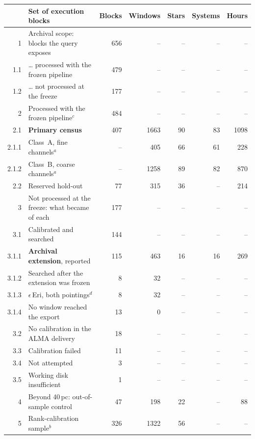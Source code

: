 \begin{tabular}{@{}r@{~}p{}rrrrr@{}}
\hline
 & Set of execution blocks & Blocks & Windows & Stars & Systems & Hours \\
\hline
1 & Archival scope: blocks the query exposes & 656 & -- & -- & -- & -- \\
1.1 & \hspace{0.8em}\ldots{} processed with the frozen pipeline & 479 & -- & -- & -- & -- \\
1.2 & \hspace{0.8em}\ldots{} not processed at the freeze & 177 & -- & -- & -- & -- \\
\hline
2 & Processed with the frozen pipeline$^{c}$ & 484 & -- & -- & -- & -- \\
2.1 & \hspace{0.8em}\textbf{Primary census} & 407 & 1663 & 90 & 83 & 1098 \\
2.1.1 & \hspace{1.6em}Class~A, fine channels$^{a}$ & -- & 405 & 66 & 61 & 228 \\
2.1.2 & \hspace{1.6em}Class~B, coarse channels$^{a}$ & -- & 1258 & 89 & 82 & 870 \\
2.2 & \hspace{0.8em}Reserved hold-out & 77 & 315 & 36 & -- & 214 \\
\hline
3 & Not processed at the freeze: what became of each & 177 & -- & -- & -- & -- \\
3.1 & \hspace{0.8em}Calibrated and searched & 144 & -- & -- & -- & -- \\
3.1.1 & \hspace{1.6em}\textbf{Archival extension}, reported & 115 & 463 & 16 & 16 & 269 \\
3.1.2 & \hspace{1.6em}Searched after the extension was frozen & 8 & 32 & -- & -- & -- \\
3.1.3 & \hspace{1.6em}$\epsilon$\,Eri, both pointings$^{d}$ & 8 & 32 & -- & -- & -- \\
3.1.4 & \hspace{1.6em}No window reached the export & 13 & 0 & -- & -- & -- \\
3.2 & \hspace{0.8em}No calibration in the ALMA delivery & 18 & -- & -- & -- & -- \\
3.3 & \hspace{0.8em}Calibration failed & 11 & -- & -- & -- & -- \\
3.4 & \hspace{0.8em}Not attempted & 3 & -- & -- & -- & -- \\
3.5 & \hspace{0.8em}Working disk insufficient & 1 & -- & -- & -- & -- \\
\hline
4 & Beyond 40\,pc: out-of-sample control & 47 & 198 & 22 & -- & 88 \\
5 & Rank-calibration sample$^{b}$ & 326 & 1322 & 56 & -- & -- \\
\hline
\end{tabular}

